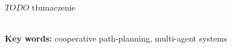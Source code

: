 \\

\\

\begin{singlespacing}

$TODO$ tłumaczenie

\flushbottom
\textbf{\\Key words: }cooperative path-planning, multi-agent systems
\end{singlespacing}
